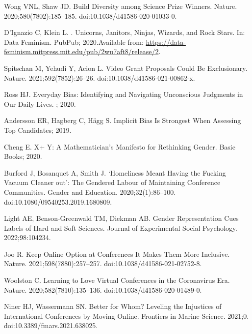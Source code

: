 \documentclass[10pt,letterpaper]{article}
\begin{document}
\begin{thebibliography}{10}
Wong VNL, Shaw JD.
\newblock Build Diversity among Science Prize Winners.
\newblock Nature. 2020;580(7802):185--185.
\newblock doi:{10.1038/d41586-020-01033-0}.

D'Ignazio C, Klein L.
. {{Unicorns}}, {{Janitors}}, {{Ninjas}}, {{Wizards}}, and {{Rock
  Stars}}.
\newblock In: Data {{Feminism}}. {PubPub}; 2020.Available from:
  \url{https://data-feminism.mitpress.mit.edu/pub/2wu7aft8/release/2}.

Spitschan M, Yehudi Y, Acion L.
\newblock Video Grant Proposals Could Be Exclusionary.
\newblock Nature. 2021;592(7852):26--26.
\newblock doi:{10.1038/d41586-021-00862-x}.

Ross HJ.
\newblock Everyday {{Bias}}: {{Identifying}} and {{Navigating Unconscious
  Judgments}} in {{Our Daily Lives}}.
; 2020.

Andersson ER, Hagberg C, H{\"a}gg S. Implicit Bias Is Strongest When Assessing
  Top Candidates; 2019.

Cheng E.
\newblock X+ Y: A Mathematician's Manifesto for Rethinking Gender.
\newblock Basic Books; 2020.

Burford J, Bosanquet A, Smith J.
\newblock `{{Homeliness}} Meant Having the Fucking Vacuum Cleaner out': The
  Gendered Labour of Maintaining Conference Communities.
\newblock Gender and Education. 2020;32(1):86--100.
\newblock doi:{10.1080/09540253.2019.1680809}.

Light AE, {Benson-Greenwald} TM, Diekman AB.
\newblock Gender Representation Cues Labels of Hard and Soft Sciences.
\newblock Journal of Experimental Social Psychology. 2022;98:104234.

Joo R.
\newblock Keep Online Option at Conferences \textemdash{} It Makes Them More
  Inclusive.
\newblock Nature. 2021;598(7880):257--257.
\newblock doi:{10.1038/d41586-021-02752-8}.

Woolston C.
\newblock Learning to Love Virtual Conferences in the Coronavirus Era.
\newblock Nature. 2020;582(7810):135--136.
\newblock doi:{10.1038/d41586-020-01489-0}.

Niner HJ, Wassermann SN.
\newblock Better for {{Whom}}? Leveling the {{Injustices}} of {{International
  Conferences}} by {{Moving Online}}.
\newblock Frontiers in Marine Science. 2021;0.
\newblock doi:{10.3389/fmars.2021.638025}.


\end{thebibliography}
\end{document}

